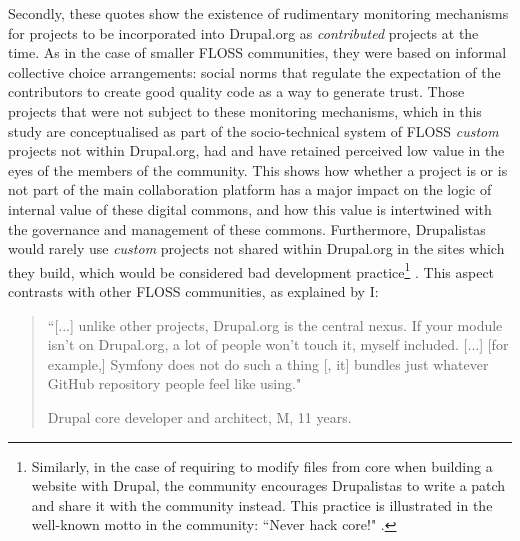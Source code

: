 Secondly, these quotes show the existence of rudimentary monitoring mechanisms for projects to be incorporated into Drupal.org as \textit{contributed} projects at the time. As in the case of smaller FLOSS communities, they were based on informal collective choice arrangements: social norms that regulate the expectation of the contributors to create good quality code as a way to generate trust. Those projects that were not subject to these monitoring mechanisms, which in this study are conceptualised as part of the socio-technical system of FLOSS \textit{custom} projects not within Drupal.org, had and have retained perceived low value in the eyes of the members of the community. This shows how whether a project is or is not part of the main collaboration platform has a major impact on the logic of internal value of these digital commons, and how this value is intertwined with the governance and management of these commons. Furthermore, Drupalistas would rarely use \textit{custom} projects not shared within Drupal.org in the sites which they build, which would be considered bad development practice\footnote{Similarly, in the case of requiring to modify files from core when building a website with Drupal, the community encourages Drupalistas to write a patch and share it with the community instead. This practice is illustrated in the well-known motto in the community: ``Never hack core!" \parencite{drupal-never-hack-core:2013:Online}.} \parencite{drupal-contributed:2013:Online}. This aspect contrasts with other FLOSS communities, as explained by I:

\begin{quotation}
``[...] unlike other projects, Drupal.org is the central nexus. If your module isn't on Drupal.org, a lot of people won't touch it, myself included. [...] [for example,] Symfony does not do such a thing [, it] bundles just whatever GitHub repository people feel like using."
\begin{flushright}\footnotesize{Drupal core developer and architect, M, 11 years.}\end{flushright}
\end{quotation}

